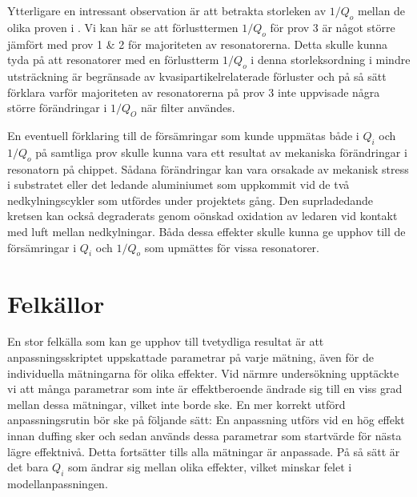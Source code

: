 \documentclass[main.tex]{subfiles}
\begin{document}
Ytterligare en intressant observation är att betrakta storleken av $1/Q_o$ mellan de olika proven i . Vi kan här se att förlusttermen $1/Q_o$ för prov 3 är något större jämfört med prov 1 \& 2 för majoriteten av resonatorerna. Detta skulle kunna tyda på att resonatorer med en förlustterm $1/Q_o$ i denna storleksordning i mindre utsträckning är begränsade av kvasipartikelrelaterade förluster och på så sätt förklara varför majoriteten av resonatorerna på prov 3 inte uppvisade några större förändringar i $1/Q_O$ när filter användes.

En eventuell förklaring till de försämringar som kunde uppmätas både i $Q_i$ och $1/Q_o$ på samtliga prov skulle kunna vara ett resultat av mekaniska förändringar i resonatorn på chippet. Sådana förändringar kan vara orsakade av mekanisk stress i substratet eller det ledande aluminiumet som uppkommit vid de två nedkylningscykler som utfördes under projektets gång. Den suprladedande kretsen kan också degraderats genom oönskad oxidation av ledaren vid kontakt med luft mellan nedkylningar. Båda dessa effekter skulle kunna ge upphov till de försämringar i $Q_i$ och $1/Q_o$ som upmättes för vissa resonatorer.






\section{Felkällor}
En stor felkälla som kan ge upphov till tvetydliga resultat är att anpassningsskriptet uppskattade parametrar på varje mätning, även för de individuella mätningarna för olika effekter. Vid närmre undersökning upptäckte vi att många parametrar som inte är effektberoende ändrade sig till en viss grad mellan dessa mätningar, vilket inte borde ske. En mer korrekt utförd anpassningsrutin bör ske på följande sätt:
En anpassning utförs vid en hög effekt innan duffing sker och sedan används dessa parametrar som startvärde för nästa lägre effektnivå. Detta fortsätter tills alla mätningar är anpassade. På så sätt är det bara $Q_i$ som ändrar sig mellan olika effekter, vilket minskar felet i modellanpassningen.
\end{document}
